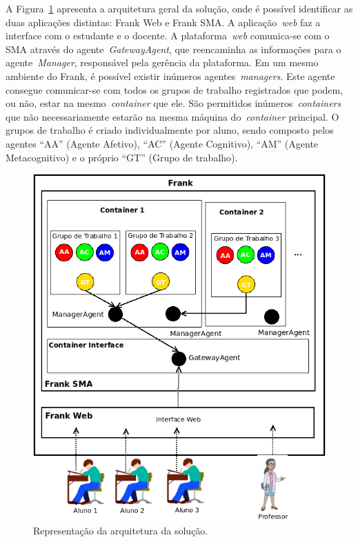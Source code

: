 A Figura~\ref{fig:arquitetura-frank} apresenta a arquitetura geral da solução, onde é possível identificar as duas aplicações distintas: Frank Web e Frank SMA. A aplicação~\emph{web} faz a interface com o estudante e o docente. A plataforma~\emph{web} comunica-se com o SMA através do agente~\emph{GatewayAgent}, que reencaminha as informações para o agente~\emph{Manager}, responsável pela gerência da plataforma. Em um mesmo ambiente do Frank, é possível existir inúmeros agentes~\emph{managers}. Este agente consegue comunicar-se com todos os grupos de trabalho registrados que podem, ou não, estar na mesmo~\emph{container} que ele. São permitidos inúmeros~\emph{containers} que não necessariamente estarão na mesma máquina do~\emph{container} principal. O grupos de trabalho é criado individualmente por aluno, sendo composto pelos agentes ``AA'' (Agente Afetivo), ``AC'' (Agente Cognitivo), ``AM'' (Agente Metacognitivo) e o próprio ``GT'' (Grupo de trabalho).
\begin{figure}
	\centering
	\includegraphics[scale=0.6]{images/arquitetura-frank.png}
	\caption{Representação da arquitetura da solução.}
	\label{fig:arquitetura-frank}
\end{figure}

